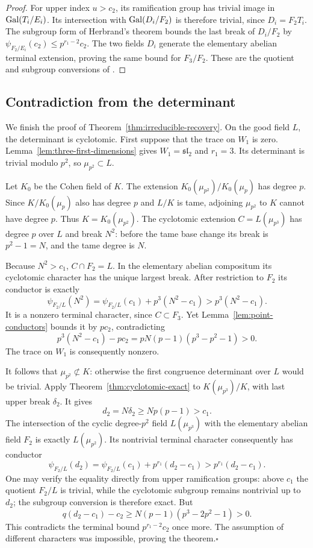 \begin{proof}
For upper index $u>c_2$, its ramification group has trivial image in $\operatorname{Gal}(T_i/E_i)$. Its intersection with $\operatorname{Gal}(D_i/F_2)$ is therefore trivial, since $D_i=F_2T_i$. The subgroup form of Herbrand's theorem bounds the last break of $D_i/F_2$ by $\psi_{F_2/E_i}(c_2)\le p^{r_1-2}c_2$. The two fields $D_i$ generate the elementary abelian terminal extension, proving the same bound for $F_3/F_2$. These are the quotient and subgroup conversions of \citet[Chapter~IV, \S3, Propositions~14--15, pp.~75--76]{Serre1979}.
\end{proof}

\subsection{Contradiction from the determinant}
We finish the proof of Theorem~\ref{thm:irreducible-recovery}. On the good field $L$, the determinant is cyclotomic. First suppose that the trace on $W_1$ is zero. Lemma~\ref{lem:three-first-dimensions} gives $W_1=\mathfrak{sl}_2$ and $r_1=3$. Its determinant is trivial modulo $p^2$, so $\mu_{p^2}\subset L$.

Let $K_0$ be the Cohen field of $K$. The extension $K_0(\mu_{p^2})/K_0(\mu_p)$ has degree $p$. Since $K/K_0(\mu_p)$ also has degree $p$ and $L/K$ is tame, adjoining $\mu_{p^2}$ to $K$ cannot have degree $p$. Thus $K=K_0(\mu_{p^2})$. The cyclotomic extension $C=L(\mu_{p^3})$ has degree $p$ over $L$ and break $N^2$: before the tame base change its break is $p^2-1=N$, and the tame degree is $N$.

Because $N^2>c_1$, $C\cap F_2=L$. In the elementary abelian compositum its cyclotomic character has the unique largest break. After restriction to $F_2$ its conductor is exactly
\[
 \psi_{F_2/L}(N^2)
       =\psi_{F_2/L}(c_1)+p^3(N^2-c_1)>p^3(N^2-c_1).
\]
It is a nonzero terminal character, since $C\subset F_3$. Yet Lemma~\ref{lem:point-conductors} bounds it by $pc_2$, contradicting
\[
 p^3(N^2-c_1)-pc_2=pN(p-1)(p^3-p^2-1)>0.
\]
The trace on $W_1$ is consequently nonzero.

It follows that $\mu_{p^2}\not\subset K$: otherwise the first congruence determinant over $L$ would be trivial. Apply Theorem~\ref{thm:cyclotomic-exact} to $K(\mu_{p^3})/K$, with last upper break $\delta_2$. It gives
\[
 d_2=N\delta_2\ge Np(p-1)>c_1.
\]
The intersection of the cyclic degree-$p^2$ field $L(\mu_{p^3})$ with the elementary abelian field $F_2$ is exactly $L(\mu_{p^2})$. Its nontrivial terminal character consequently has conductor
\[
 \psi_{F_2/L}(d_2)
     =\psi_{F_2/L}(c_1)+p^{r_1}(d_2-c_1)
     >p^{r_1}(d_2-c_1).
\]
One may verify the equality directly from upper ramification groups: above $c_1$ the quotient $F_2/L$ is trivial, while the cyclotomic subgroup remains nontrivial up to $d_2$; the subgroup conversion is therefore exact. But
\[
 q(d_2-c_1)-c_2\ge N(p-1)(p^3-2p^2-1)>0.
\]
This contradicts the terminal bound $p^{r_1-2}c_2$ once more. The assumption of different characters was impossible, proving the theorem.\hfill$\square$
